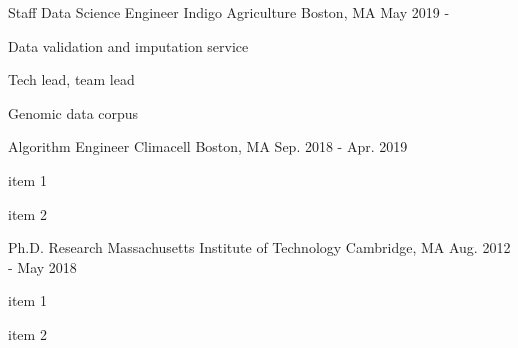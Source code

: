 

\begin{cventries}

  \cventry
    {Staff Data Science Engineer} %
    {Indigo Agriculture} %
    {Boston, MA} %
    {May 2019 -} %
    {
      \begin{cvitems} %
        \item {Data validation and imputation service}
        \item {Tech lead, team lead}
        \item {Genomic data corpus}
      \end{cvitems}
    }

  \cventry
    {Algorithm Engineer} %
    {Climacell} %
    {Boston, MA} %
    {Sep. 2018 - Apr. 2019} %
    {
      \begin{cvitems} %
        \item {item 1}
        \item {item 2}
      \end{cvitems}
    }

  \cventry
    {Ph.D. Research} %
    {Massachusetts Institute of Technology} %
    {Cambridge, MA} %
    {Aug. 2012 - May 2018} %
    {
      \begin{cvitems} %
        \item {item 1}
        \item {item 2}
      \end{cvitems}
    }
\end{cventries}
